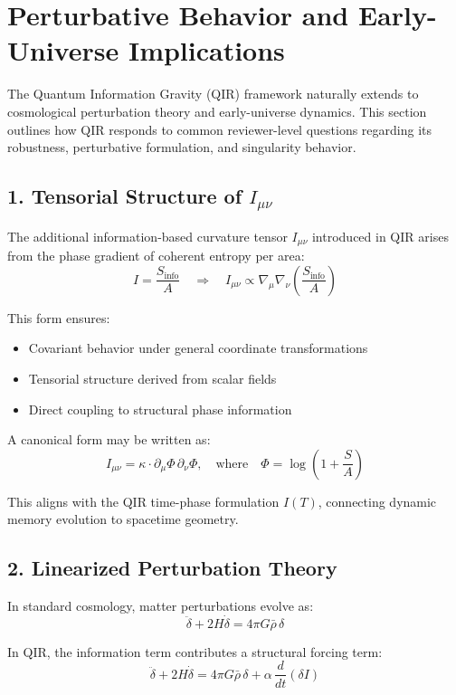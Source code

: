 \documentclass[11pt]{article}
\begin{document}
\section{Perturbative Behavior and Early-Universe Implications}

The Quantum Information Gravity (QIR) framework naturally extends to cosmological perturbation theory and early-universe dynamics. This section outlines how QIR responds to common reviewer-level questions regarding its robustness, perturbative formulation, and singularity behavior.

\subsection*{1. Tensorial Structure of $I_{\mu\nu}$}

The additional information-based curvature tensor $I_{\mu\nu}$ introduced in QIR arises from the phase gradient of coherent entropy per area:
\[
I = \frac{S_{\text{info}}}{A} \quad \Rightarrow \quad I_{\mu\nu} \propto \nabla_\mu \nabla_\nu \left( \frac{S_{\text{info}}}{A} \right)
\]

This form ensures:
\begin{itemize}
  \item Covariant behavior under general coordinate transformations
  \item Tensorial structure derived from scalar fields
  \item Direct coupling to structural phase information
\end{itemize}

A canonical form may be written as:
\[
I_{\mu\nu} = \kappa \cdot \partial_\mu \Phi \, \partial_\nu \Phi, \quad \text{where} \quad \Phi = \log\left(1 + \frac{S}{A}\right)
\]

This aligns with the QIR time-phase formulation $I(T)$, connecting dynamic memory evolution to spacetime geometry.

\subsection*{2. Linearized Perturbation Theory}

In standard cosmology, matter perturbations evolve as:
\[
\ddot{\delta} + 2H \dot{\delta} = 4\pi G \bar{\rho} \, \delta
\]

In QIR, the information term contributes a structural forcing term:
\[
\ddot{\delta} + 2H \dot{\delta} = 4\pi G \bar{\rho} \, \delta + \alpha \, \frac{d}{dt}(\delta I)
\]
\end{document}
